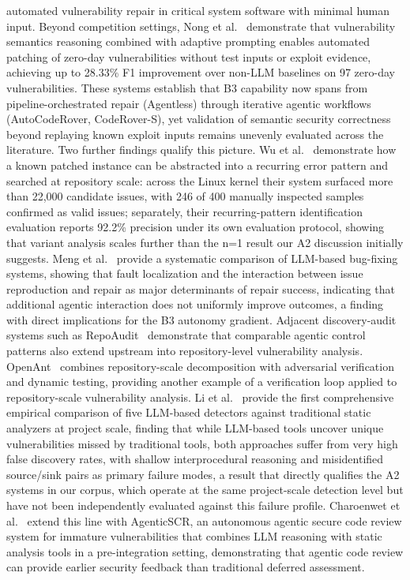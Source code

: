 \documentclass[conference,compsoc]{IEEEtran}
\begin{document}
automated vulnerability repair in critical system software with minimal human input.
Beyond competition settings, Nong et al.~\cite{appatch2025} demonstrate that vulnerability
semantics reasoning combined with adaptive prompting enables automated patching of zero-day
vulnerabilities without test inputs or exploit evidence, achieving up to 28.33\% F1 improvement
over non-LLM baselines on 97 zero-day vulnerabilities. These systems establish that B3 capability now
spans from pipeline-orchestrated repair (Agentless) through iterative agentic workflows
(AutoCodeRover, CodeRover-S), yet validation of semantic security correctness beyond replaying known exploit inputs remains
unevenly evaluated across the literature. Two further findings qualify this picture. Wu et
al.~\cite{onebug2025} demonstrate how a known patched instance can be abstracted into a
recurring error pattern and searched at repository scale: across the Linux kernel their system
surfaced more than 22{,}000 candidate issues, with 246 of 400 manually inspected samples
confirmed as valid issues; separately, their recurring-pattern identification evaluation reports
92.2\% precision under its own evaluation protocol, showing that variant analysis scales further
than the n=1 result our A2 discussion initially suggests. Meng et al.~\cite{llmagentsbugfixing2026} provide a systematic comparison of
LLM-based bug-fixing systems, showing that fault localization and the interaction between issue
reproduction and repair as major determinants of repair success, indicating that additional
agentic interaction does not uniformly improve outcomes, a finding with direct implications
for the B3 autonomy gradient.
Adjacent discovery-audit systems such as RepoAudit~\cite{repoaudit2025} demonstrate that
comparable agentic control patterns also extend upstream into repository-level vulnerability
analysis. OpenAnt~\cite{openant2026} combines repository-scale decomposition with adversarial
verification and dynamic testing, providing another example of a verification loop applied to
repository-scale vulnerability analysis. Li et al.~\cite{projectscale2026} provide the first
comprehensive empirical comparison of five LLM-based detectors against traditional static
analyzers at project scale, finding that while LLM-based tools uncover unique vulnerabilities
missed by traditional tools, both approaches suffer from very high false discovery rates, with
shallow interprocedural reasoning and misidentified source/sink pairs as primary failure modes, 
a result that directly qualifies the A2 systems in our corpus, which operate at the same
project-scale detection level but have not been independently evaluated against this
failure profile.
Charoenwet et al.~\cite{agenticscr2026} extend this line with AgenticSCR, an autonomous
agentic secure code review system for immature vulnerabilities that combines LLM reasoning
with static analysis tools in a pre-integration setting, demonstrating that agentic
code review can provide earlier security feedback than traditional deferred assessment.
\end{document}
